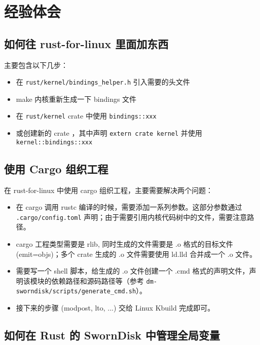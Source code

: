 \clearpage
\section{经验体会}

\subsection{如何往 rust-for-linux 里面加东西}

主要包含以下几步：

\begin{itemize}[itemsep=2pt,topsep=0pt,parsep=0pt]
  \item 在 \texttt{rust/kernel/bindings_helper.h} 引入需要的头文件
  \item make 内核重新生成一下 bindings 文件
  \item 在 \texttt{rust/kernel} crate 中使用 \texttt{bindings::xxx}
  \item 或创建新的 crate ，其中声明 \texttt{extern crate kernel} 并使用 \texttt{kernel::bindings::xxx}
\end{itemize}

\subsection{使用 Cargo 组织工程}

在 rust-for-linux 中使用 cargo 组织工程，主要需要解决两个问题：

\begin{itemize}[itemsep=2pt,topsep=0pt,parsep=0pt]
  \item 在 cargo 调用 rustc 编译的时候，需要添加一系列参数。这部分参数通过 \texttt{.cargo/config.toml} 声明；由于需要引用内核代码树中的文件，需要注意路径。
  \item cargo 工程类型需要是 rlib, 同时生成的文件需要是 .o 格式的目标文件 (emit=objs)；多个 crate 生成的 .o 文件需要使用 ld.lld 合并成一个 .o 文件。
  \item 需要写一个 shell 脚本，给生成的 .o 文件创建一个 .cmd 格式的声明文件，声明该模块的依赖路径和源码路径等（参考 \texttt{dm-sworndisk/scripts/generate_cmd.sh}）。
  \item 接下来的步骤 (modpost, lto, ...) 交给 Linux Kbuild 完成即可。
\end{itemize}

\subsection{如何在 Rust 的 SwornDisk 中管理全局变量}

